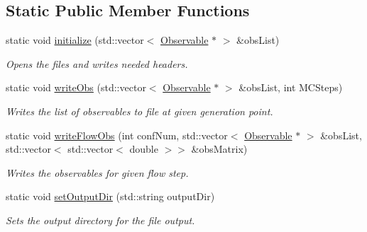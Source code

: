 \subsection*{Static Public Member Functions}
\begin{DoxyCompactItemize}
\item 
static void \hyperlink{classLatticeIO_1_1OutputObs_a472ae3b7d294a80a89642b6464ee8f7d}{initialize} (std\+::vector$<$ \hyperlink{classObservable}{Observable} $\ast$ $>$ \&obs\+List)
\begin{DoxyCompactList}\small\item\em Opens the files and writes needed headers. \end{DoxyCompactList}\item 
static void \hyperlink{classLatticeIO_1_1OutputObs_a914832abc00b24dc989a3f0b066ff026}{write\+Obs} (std\+::vector$<$ \hyperlink{classObservable}{Observable} $\ast$ $>$ \&obs\+List, int M\+C\+Steps)
\begin{DoxyCompactList}\small\item\em Writes the list of observables to file at given generation point. \end{DoxyCompactList}\item 
static void \hyperlink{classLatticeIO_1_1OutputObs_a29d0eca3206d892a926ecf051c0ecfc3}{write\+Flow\+Obs} (int conf\+Num, std\+::vector$<$ \hyperlink{classObservable}{Observable} $\ast$ $>$ \&obs\+List, std\+::vector$<$ std\+::vector$<$ double $>$$>$ \&obs\+Matrix)
\begin{DoxyCompactList}\small\item\em Writes the observables for given flow step. \end{DoxyCompactList}\item 
static void \hyperlink{classLatticeIO_1_1OutputObs_a3adffec5a9f218182a6d45cce7735362}{set\+Output\+Dir} (std\+::string output\+Dir)
\begin{DoxyCompactList}\small\item\em Sets the output directory for the file output. \end{DoxyCompactList}\end{DoxyCompactItemize}

